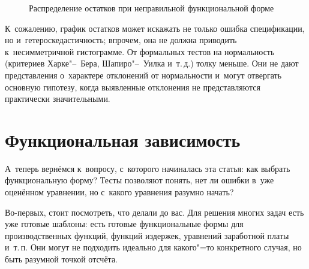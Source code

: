 \documentclass[final,pdftex]{../../template/epsilonj}
\begin{document}
\begin{figure}[htbp]
	\centering
	 \quad
	\caption{Распределение остатков при неправильной функциональной форме}\label{fig:histqq}
\end{figure}


К~сожалению, график остатков может искажать не только ошибка спецификации, но и~гетероскедастичность; впрочем, она не должна приводить к~несимметричной гистограмме. От формальных тестов на нормальность (критериев Харке"--~Бера, Шапиро"--~Уилка и~т.\,д.) толку меньше. Они не дают представления о~характере отклонений от нормальности и~могут отвергать основную гипотезу, когда выявленные отклонения не представляются практически значительными.

\section{Функциональная зависимость}

А~теперь вернёмся к~вопросу, с~которого начиналась эта статья: как выбрать функциональную форму? Тесты позволяют понять, нет ли ошибки в~уже оценённом уравнении, но с~какого уравнения разумно начать?

Во-первых, стоит посмотреть, что делали до вас. Для решения многих задач есть уже готовые шаблоны: есть готовые функциональные формы для производственных функций, функций издержек, уравнений заработной платы и~т.\,п. Они могут не подходить идеально для какого"=то конкретного случая, но быть разумной точкой отсчёта.
\end{document}
